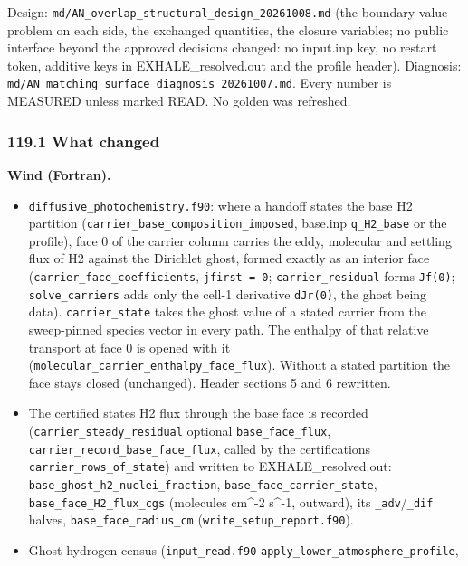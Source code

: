 \documentclass[english,a4paper]{my_memo}
\providecommand{\tightlist}{\setlength{\itemsep}{0pt}\setlength{\parskip}{0pt}}
\begin{document}
Design: \texttt{md/AN\_overlap\_structural\_design\_20261008.md} (the boundary-value
problem on each side, the exchanged quantities, the closure variables; no
public interface beyond the approved decisions changed: no input.inp key, no
restart token, additive keys in EXHALE\_resolved.out and the profile header).
Diagnosis: \texttt{md/AN\_matching\_surface\_diagnosis\_20261007.md}. Every number is
MEASURED unless marked READ. No golden was refreshed.

\subsubsection{119.1 What changed}\label{1191-what-changed}

\textbf{Wind (Fortran).}

\begin{itemize}
\tightlist
\item
  \texttt{diffusive\_photochemistry.f90}: where a handoff states the base H2
  partition (\texttt{carrier\_base\_composition\_imposed}, base.inp \texttt{q\_H2\_base} or the
  profile), face 0 of the carrier column carries the eddy, molecular and
  settling flux of H2 against the Dirichlet ghost, formed exactly as an
  interior face (\texttt{carrier\_face\_coefficients}, \texttt{jfirst\ =\ 0}; \texttt{carrier\_residual}
  forms \texttt{Jf(0)}; \texttt{solve\_carriers} adds only the cell-1 derivative \texttt{dJr(0)},
  the ghost being data). \texttt{carrier\_state} takes the ghost value of a stated
  carrier from the sweep-pinned species vector in every path. The enthalpy of
  that relative transport at face 0 is opened with it
  (\texttt{molecular\_carrier\_enthalpy\_face\_flux}). Without a stated partition the
  face stays closed (unchanged). Header sections 5 and 6 rewritten.
\item
  The certified state\textquotesingle s H2 flux through the base face is recorded
  (\texttt{carrier\_steady\_residual} optional \texttt{base\_face\_flux},
  \texttt{carrier\_record\_base\_face\_flux}, called by the certification\textquotesingle s
  \texttt{carrier\_rows\_of\_state}) and written to EXHALE\_resolved.out:
  \texttt{base\_ghost\_h2\_nuclei\_fraction}, \texttt{base\_face\_carrier\_state},
  \texttt{base\_face\_H2\_flux\_cgs} (molecules cm\^{}-2 s\^{}-1, outward), its \texttt{\_adv}/\texttt{\_dif}
  halves, \texttt{base\_face\_radius\_cm} (\texttt{write\_setup\_report.f90}).
\item
  Ghost hydrogen census (\texttt{input\_read.f90} \texttt{apply\_lower\_atmosphere\_profile},

\end{itemize}
\end{document}
